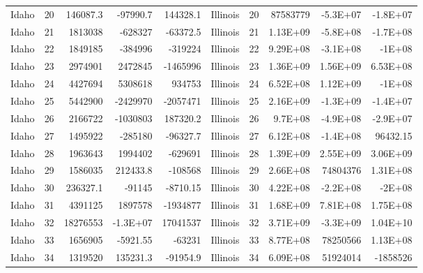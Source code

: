 \begin{landscape}
\begin{singlespace}
\begin{longtable}{lrrrr|lrrrr}
		Idaho &  20 & 146087.3 & -97990.7 & 144328.1 & Illinois &  20 & 87583779 & -5.3E+07 & -1.8E+07 \\
		Idaho &  21 & 1813038 & -628327 & -63372.5 & Illinois &  21 & 1.13E+09 & -5.8E+08 & -1.7E+08 \\
		Idaho &  22 & 1849185 & -384996 & -319224 & Illinois &  22 & 9.29E+08 & -3.1E+08 & -1E+08 \\
		Idaho &  23 & 2974901 & 2472845 & -1465996 & Illinois &  23 & 1.36E+09 & 1.56E+09 & 6.53E+08 \\
		Idaho &  24 & 4427694 & 5308618 & 934753 & Illinois &  24 & 6.52E+08 & 1.12E+09 & -1E+08 \\
		Idaho &  25 & 5442900 & -2429970 & -2057471 & Illinois &  25 & 2.16E+09 & -1.3E+09 & -1.4E+07 \\
		Idaho &  26 & 2166722 & -1030803 & 187320.2 & Illinois &  26 & 9.7E+08 & -4.9E+08 & -2.9E+07 \\
		Idaho &  27 & 1495922 & -285180 & -96327.7 & Illinois &  27 & 6.12E+08 & -1.4E+08 & 96432.15 \\
		Idaho &  28 & 1963643 & 1994402 & -629691 & Illinois &  28 & 1.39E+09 & 2.55E+09 & 3.06E+09 \\
		Idaho &  29 & 1586035 & 212433.8 & -108568 & Illinois &  29 & 2.66E+08 & 74804376 & 1.31E+08 \\
		Idaho &  30 & 236327.1 & -91145 & -8710.15 & Illinois &  30 & 4.22E+08 & -2.2E+08 & -2E+08 \\
		Idaho &  31 & 4391125 & 1897578 & -1934877 & Illinois &  31 & 1.68E+09 & 7.81E+08 & 1.75E+08 \\
		Idaho &  32 & 18276553 & -1.3E+07 & 17041537 & Illinois &  32 & 3.71E+09 & -3.3E+09 & 1.04E+10 \\
		Idaho &  33 & 1656905 & -5921.55 & -63231 & Illinois &  33 & 8.77E+08 & 78250566 & 1.13E+08 \\
		Idaho &  34 & 1319520 & 135231.3 & -91954.9 & Illinois &  34 & 6.09E+08 & 51924014 & -1858526\\


\end{longtable}
\end{singlespace}
\end{landscape}
